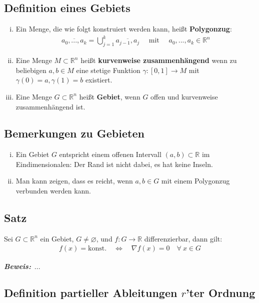 \documentclass[11pt,a4paper]{book}
\newcommand {\R}	{\mathbb{R}}
\newcommand {\Rn}	{\mathbb{R}^n}
\newcommand{\1}    	{\mathbbm{1}}
\newcommand{\mitt}	{\textrm{ mit }}
\newcommand{\Beweis}[1][Beweis]
{\begin{mdframed}[backgroundcolor=gray!10,linewidth=0pt]\noindent\textit{\textbf{{#1}:}}~}
\newcommand{\QED}	{\end{mdframed}}
\begin{document}
\subsection{Definition eines Gebiets}

\begin{enumerate}[(i)]
	\item Ein Menge, die wie folgt konstruiert werden kann, heißt \textbf{Polygonzug}:
	\begin{align*}
		\overline{ a_0, ..., a_k} = \bigcup_{j=1}^k \overline{a_{j-1},a_j} \quad\mitt\quad a_0, ..., a_k \in \Rn
	\end{align*}	
	\item Eine Menge \(M \subset \Rn\) heißt \textbf{kurvenweise zusammenhängend} wenn zu beliebigen \(a,b \in M\) eine stetige Funktion \(\gamma : [0,1] \rightarrow M\) mit \(\gamma(0) = a, \gamma(1) = b\) existiert.
	\item Eine Menge \(G \subset \Rn\) heißt \textbf{Gebiet}, wenn \(G\) offen und kurvenweise zusammenhängend ist.
\end{enumerate}


\subsection{Bemerkungen zu Gebieten}

\begin{enumerate}[(i)]
	\item Ein Gebiet \(G\) entspricht einem offenen Intervall \( (a,b) \subset \R\) im Eindimensionalen: Der Rand ist nicht dabei, es hat keine Inseln.
	\item Man kann zeigen, dass es reicht, wenn \(a,b \in G\) mit einem Polygonzug verbunden werden kann.
\end{enumerate}
	
\subsection{Satz}

Sei \(G \subset \Rn\) ein Gebiet, \(G \neq \varnothing\), und \(f : G \rightarrow \R\) differenzierbar, dann gilt:
\begin{align*}
	f(x) = \textrm{konst.} \quad\Leftrightarrow\quad \nabla f(x) = 0 \quad \forall~ x \in G
\end{align*}

\Beweis ...
\QED

\subsection{Definition partieller Ableitungen \(r\)'ter Ordnung}
\end{document}
